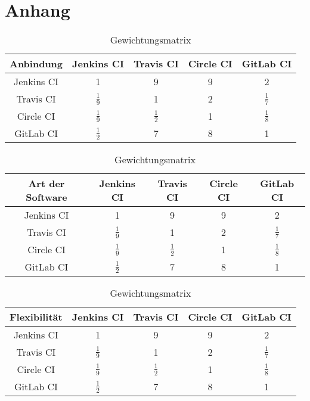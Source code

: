 \chapter{Anhang}
\begin{table}[h!]
	\centering
	\begin{tabular}{c|cccc}
		Anbindung  & Jenkins CI		 & Travis CI& Circle CI & GitLab CI   \\ 
		\hline
		Jenkins CI      & 1     		      &        9        &      9       &      2     \\
		Travis CI &   $\frac{1}{9}$     & 1               &  2&$\frac{1}{7}$      \\
		Circle CI   &   $\frac{1}{9}$     &  $\frac{1}{2}$   & 1            & $\frac{1}{8}$  \\
		GitLab CI    &    $\frac{1}{2}$    &  7   &        8      & 1           \\
	\end{tabular}
	\caption{Gewichtungsmatrix}
\end{table}

\begin{table}[h!]
	\centering
	\begin{tabular}{c|cccc}
		Art der Software   & Jenkins CI		 & Travis CI& Circle CI & GitLab CI   \\ 
		\hline
		Jenkins CI      & 1     		      &        9        &      9       &      2     \\
		Travis CI &   $\frac{1}{9}$     & 1               &  2&$\frac{1}{7}$      \\
		Circle CI   &   $\frac{1}{9}$     &  $\frac{1}{2}$   & 1            & $\frac{1}{8}$  \\
		GitLab CI    &    $\frac{1}{2}$    &  7   &        8      & 1           \\
	\end{tabular}
	\caption{Gewichtungsmatrix}
\end{table}

\begin{table}[h!]
	\centering
	\begin{tabular}{c|cccc}
		Flexibilität   & Jenkins CI		 & Travis CI& Circle CI & GitLab CI   \\ 
		\hline
		Jenkins CI      & 1     		      &        9        &      9       &      2     \\
		Travis CI &   $\frac{1}{9}$     & 1               &  2&$\frac{1}{7}$      \\
		Circle CI   &   $\frac{1}{9}$     &  $\frac{1}{2}$   & 1            & $\frac{1}{8}$  \\
		GitLab CI    &    $\frac{1}{2}$    &  7   &        8      & 1           \\
	\end{tabular}
	\caption{Gewichtungsmatrix}
\end{table}


